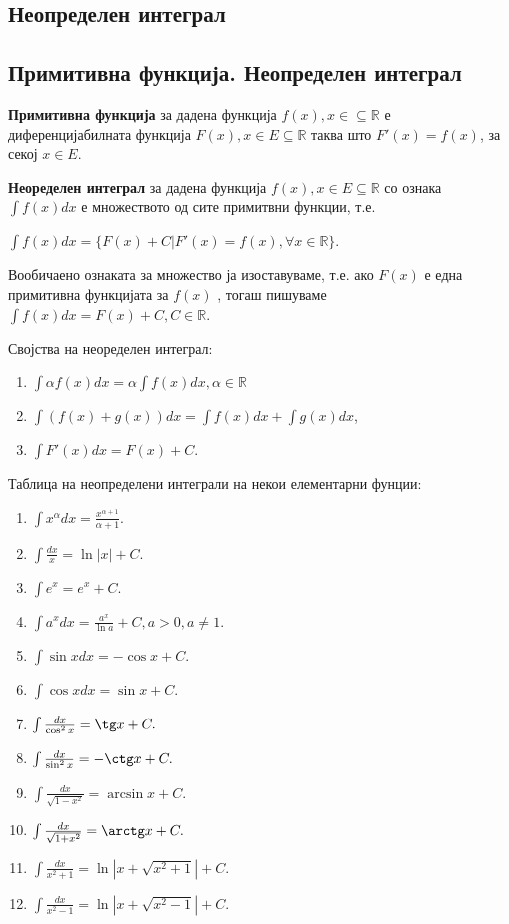 \documentclass[12pt]{article}
\begin{document}
\begin{center}
  \section{Неопределен интеграл}
  \subsection{Примитивна функција. Неопределен интеграл }
\end{center}
\par
\textbf{Примитивна функција} за дадена функција $f(x), x\in \subseteq \mathbb{R} $ е диференцијабилната функција $F(x), x \in E \subseteq \mathbb{R}$ таква што $F'(x)=f(x)$, за секој $x \in E$.
\par
\textbf{Неоределен интеграл} за дадена функција $f(x), x\in E \subseteq \mathbb{R} $ со ознака $\int f(x)dx$ е
множеството од сите примитвни функции, т.е.
\par
$\int f(x)dx = \lbrace F(x)+C | F'(x)=f(x),\forall x \in \mathbb{R} \rbrace$.
\par Вообичаено ознаката за множество ја изоставуваме, т.е. ако $F(x)$ е една
примитивна функцијата за $f(x)$ , тогаш пишуваме $\int f(x)dx = F(x)+C,C\in\mathbb{R}$.
\par Својства на неоределен интеграл:
\begin{enumerate}
  \item $\int \alpha f(x)dx =\alpha\int f(x)dx,\alpha\in\mathbb{R}$
  \item $\int (f(x) +g(x))dx =\int f(x)dx+\int g(x)dx$,
  \item $\int F'(x)dx=F(x)+C$.
\end{enumerate}
Таблица на неопределени интеграли на некои елементарни фунции:
\par
\begin{multicols}{2}
  \begin{enumerate}
    \item $\int x^\alpha dx = \frac{x^{\alpha +1}}{\alpha+1}.$
    \item $\int \frac{dx}{x}=\ln |x|+C.$
    \item $\int e^x=e^x + C.$
    \item $\int a^x dx = \frac{a^x}{\ln a}+C, a>0,a\neq 1.$
    \item $\int \sin xdx=-\cos x+C.$
    \item $\int \cos xdx=\sin x+C.$
    \item $\int \frac{dx}{\cos^2 x} = \tg x+C.$
    \item $\int \frac{dx}{\sin^2 x}=-\ctg x+C.$
    \item $\int \frac{dx}{\sqrt{1-x^2}}=\arcsin x+C.$
    \item $\int \frac{dx}{\sqrt{1+x^2}}=\arctg x+C.$
    \item $\int \frac{dx}{x^2 + 1}=\ln |x+\sqrt{x^2 + 1}|+C.$
    \item $\int \frac{dx}{x^2 - 1}=\ln |x+\sqrt{x^2 - 1}|+C.$
  \end{enumerate}
\end{multicols}
\end{document}
